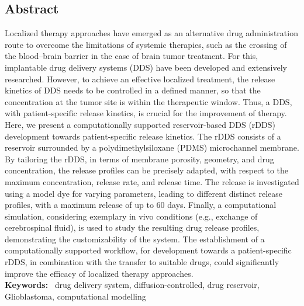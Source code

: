 \newpage


\subsection*{Abstract}
Localized therapy approaches have emerged as an alternative drug administration route to overcome the limitations of systemic therapies, such as the crossing of the blood–brain barrier in the case of brain tumor treatment. For this, implantable drug delivery systems (DDS) have been developed and extensively researched. However, to achieve an effective localized treatment, the release kinetics of DDS needs to be controlled in a defined manner, so that the concentration at the tumor site is within the therapeutic window. Thus, a DDS, with patient-specific release kinetics, is crucial for the improvement of therapy. Here, we present a computationally supported reservoir-based DDS (rDDS) development towards patient-specific release kinetics. The rDDS consists of a reservoir surrounded by a polydimethylsiloxane (PDMS) microchannel membrane. By tailoring the rDDS, in terms of membrane porosity, geometry, and drug concentration, the release profiles can be precisely adapted, with respect to the maximum concentration, release rate, and release time. The release is investigated using a model dye for varying parameters, leading to different distinct release profiles, with a maximum release of up to 60 days. Finally, a computational simulation, considering exemplary in vivo conditions (e.g., exchange of cerebrospinal fluid), is used to study the resulting drug release profiles, demonstrating the customizability of the system. The establishment of a computationally supported workflow, for development towards a patient-specific rDDS, in combination with the transfer to suitable drugs, could significantly improve the efficacy of localized therapy approaches. \\

\textbf{Keywords: }~drug delivery system, diffusion-controlled, drug reservoir, Glioblastoma, computational modelling

